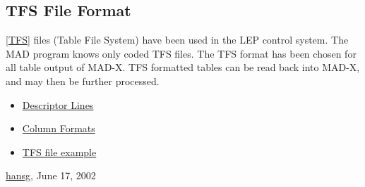 




\subsection{TFS File Format}
\href{bibliography.html#tfs}{[TFS]} files (Table File System) have been used in the LEP control system. The MAD program knows only coded TFS files. The TFS format has been chosen for all table output of MAD-X. TFS formatted tables can be read back into MAD-X, and may then be further processed. 
\begin{itemize}
	\item \href{tfs_desc.html}{Descriptor Lines}
	\item \href{tfs_columns.html}{Column Formats}
	\item \href{select.html#tfs}{TFS file example}
\end{itemize}

\href{http://www.cern.ch/Hans.Grote/hansg_sign.html}{hansg}, June 17, 2002 





